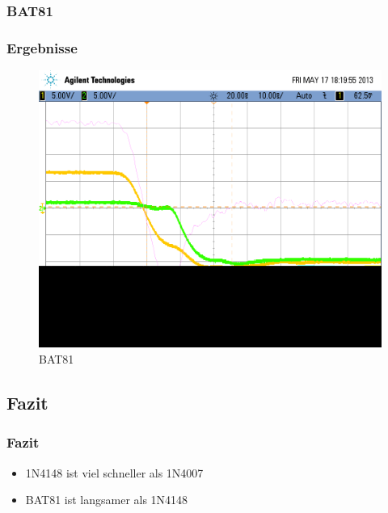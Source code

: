 \subsubsection{BAT81}
\begin{frame}
\frametitle{Ergebnisse}
  \begin{figure}
    \includegraphics[width=0.7\columnwidth]{fig/scope_20_2.png}
    \caption{BAT81}
  \end{figure}
\end{frame}

\subsection{Fazit}
\begin{frame}
\frametitle{Fazit}
  \begin{itemize}
    \item 1N4148 ist viel schneller als 1N4007
    \item BAT81 ist langsamer als 1N4148
  \end{itemize}
\end{frame}
